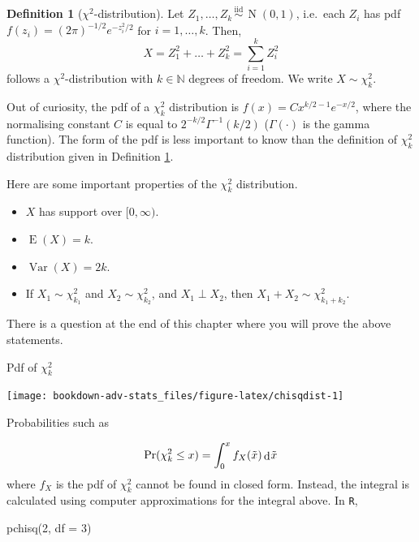 \documentclass[
]{book}
\newenvironment{Shaded}{\begin{snugshade}}{\end{snugshade}}
\newcommand{\AttributeTok}[1]{\textcolor[rgb]{0.77,0.63,0.00}{#1}}
\newcommand{\DecValTok}[1]{\textcolor[rgb]{0.00,0.00,0.81}{#1}}
\newcommand{\FunctionTok}[1]{\textcolor[rgb]{0.00,0.00,0.00}{#1}}
\newcommand{\NormalTok}[1]{#1}
\providecommand{\tightlist}{%
  \setlength{\itemsep}{0pt}\setlength{\parskip}{0pt}}
\DeclareMathOperator{\E}{E}
\DeclareMathOperator{\Var}{Var}
\DeclareMathOperator{\N}{N}
\newcommand{\iid}{\,\overset{\text{iid}}{\sim}\,}
\newcommand{\bbN}{\mathbb{N}}
\DeclareMathOperator{\dd}{d}
\newcommand{\dint}{\dd\hspace{0.5pt}\!}
\theoremstyle{definition}
\newtheorem{definition}{Definition}[chapter]
\theoremstyle{definition}
\theoremstyle{definition}
\theoremstyle{definition}
\theoremstyle{remark}
\begin{document}
\begin{definition}[$\chi^2$-distribution]
\protect\hypertarget{def:chisq}{}\label{def:chisq}Let \(Z_1,\dots,Z_k \iid \N(0,1)\), i.e.~each \(Z_i\) has pdf \(f(z_i) = (2\pi)^{-1/2}e^{-z_i^2/2}\) for \(i=1,\dots,k\).
Then,
\[X = Z_1^2 + \dots + Z_k^2 = \sum_{i=1}^k Z_i^2\]
follows a \(\chi^2\)-distribution with \(k\in\bbN\) degrees of freedom.
We write
\(X \sim \chi^2_k\).
\end{definition}

Out of curiosity, the pdf of a \(\chi^2_k\) distribution is \(f(x) = Cx^{k/2-1}e^{-x/2}\), where the normalising constant \(C\) is equal to \(2^{-k/2}\Gamma^{-1}(k/2)\) (\(\Gamma(\cdot)\) is the gamma function).
The form of the pdf is less important to know than the definition of \(\chi^2_k\) distribution given in Definition \ref{def:chisq}.

Here are some important properties of the \(\chi^2_k\) distribution.

\begin{itemize}
\tightlist
\item
  \(X\) has support over \([0,\infty)\).
\item
  \(\E(X)=k\).
\item
  \(\Var(X) = 2k\).
\item
  If \(X_1\sim\chi^2_{k_1}\) and \(X_2\sim\chi^2_{k_2}\), and
  \(X_1 \perp X_2\), then \(X_1+X_2\sim \chi^2_{k_1+k_2}\).
\end{itemize}

There is a question at the end of this chapter where you will prove the above statements.

Pdf of \(\chi^2_k\)

\begin{center}\texttt{[image: bookdown-adv-stats\_files/figure-latex/chisqdist-1]} \end{center}

Probabilities such as

\[\Pr(\chi_k^2 \leq x) = \int_0^x f_X(\tilde x) \dint \tilde x\] where \(f_X\) is the pdf of \(\chi^2_k\) cannot be found in closed form.
Instead, the integral is calculated using computer approximations for the integral above.
In \texttt{R},

\begin{Shaded}
\begin{Highlighting}[]
\FunctionTok{pchisq}\NormalTok{(}\DecValTok{2}\NormalTok{, }\AttributeTok{df =} \DecValTok{3}\NormalTok{)}
\end{Highlighting}
\end{Shaded}
\end{document}
